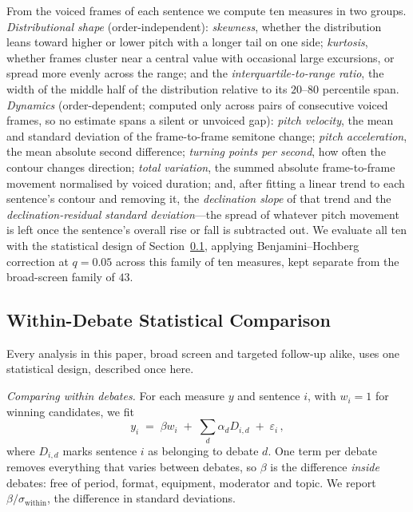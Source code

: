 \documentclass[journal]{IEEEtran}
\begin{document}
From the voiced frames of each sentence we compute ten measures in two
groups. \emph{Distributional shape} (order-independent): \emph{skewness}, whether
the distribution leans toward higher or lower pitch with a longer tail on
one side; \emph{kurtosis}, whether frames cluster near a central value with
occasional large excursions, or spread more evenly across the range; and the
\emph{interquartile-to-range ratio}, the width of the middle half of the
distribution relative to its $20$--$80$ percentile span. \emph{Dynamics}
(order-dependent; computed only across pairs of consecutive voiced frames, so
no estimate spans a silent or unvoiced gap): \emph{pitch velocity}, the mean
and standard deviation of the frame-to-frame semitone change; \emph{pitch
acceleration}, the mean absolute second difference; \emph{turning points per
second}, how often the contour changes direction; \emph{total variation}, the
summed absolute frame-to-frame movement normalised by voiced duration; and,
after fitting a linear trend to each sentence's contour and removing it, the
\emph{declination slope} of that trend and the \emph{declination-residual
standard deviation}---the spread of whatever pitch movement is left once the
sentence's overall rise or fall is subtracted out. We evaluate all ten with
the statistical design of Section~\ref{sec:method:fe}, applying
Benjamini--Hochberg correction at $q = 0.05$ across this family of ten
measures, kept separate from the broad-screen family of $43$.

\subsection{Within-Debate Statistical Comparison}
\label{sec:method:fe}

Every analysis in this paper, broad screen and targeted follow-up alike,
uses one statistical design, described once here.

\emph{Comparing within debates.} For each measure $y$ and sentence $i$, with
$w_i = 1$ for winning candidates, we fit
\begin{equation}
y_i \;=\; \beta w_i \;+\; \sum_{d} \alpha_d D_{i,d} \;+\; \varepsilon_i \,,
\label{eq:fe}
\end{equation}
where $D_{i,d}$ marks sentence $i$ as belonging to debate $d$. One term per
debate removes everything that varies between debates, so $\beta$ is the
difference \emph{inside} debates: free of period, format, equipment,
moderator and topic. We report $\beta/\sigma_{\text{within}}$, the
difference in standard deviations.
\end{document}
